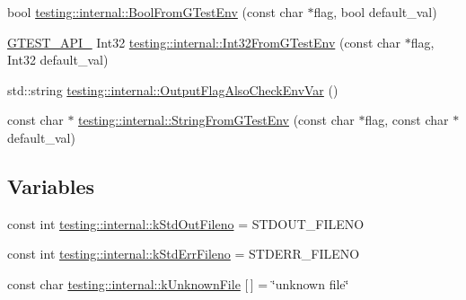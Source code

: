\begin{DoxyCompactItemize}
\item 
bool \mbox{\hyperlink{namespacetesting_1_1internal_a67132cdce23fb71b6c38ee34ef81eb4c}{testing\+::internal\+::\+Bool\+From\+G\+Test\+Env}} (const char $\ast$flag, bool default\+\_\+val)
\item 
\mbox{\hyperlink{_obj__test_2lib_2googletest-release-1_88_81_2googletest_2include_2gtest_2internal_2gtest-port_8h_aa73be6f0ba4a7456180a94904ce17790}{G\+T\+E\+S\+T\+\_\+\+A\+P\+I\+\_\+}} Int32 \mbox{\hyperlink{namespacetesting_1_1internal_a0f7e728793f9e6cb0aa2b69eaa468bf3}{testing\+::internal\+::\+Int32\+From\+G\+Test\+Env}} (const char $\ast$flag, Int32 default\+\_\+val)
\item 
std\+::string \mbox{\hyperlink{namespacetesting_1_1internal_a0c793c6d84760d900299916c077a1af4}{testing\+::internal\+::\+Output\+Flag\+Also\+Check\+Env\+Var}} ()
\item 
const char $\ast$ \mbox{\hyperlink{namespacetesting_1_1internal_a7ed785df46a339403b0f749d3a879201}{testing\+::internal\+::\+String\+From\+G\+Test\+Env}} (const char $\ast$flag, const char $\ast$default\+\_\+val)
\end{DoxyCompactItemize}
\subsection*{Variables}
\begin{DoxyCompactItemize}
\item 
const int \mbox{\hyperlink{namespacetesting_1_1internal_a24f0a3d50cac54a9132f4828ec9b96d9}{testing\+::internal\+::k\+Std\+Out\+Fileno}} = S\+T\+D\+O\+U\+T\+\_\+\+F\+I\+L\+E\+NO
\item 
const int \mbox{\hyperlink{namespacetesting_1_1internal_a747eccfdbdee3ff8af3bedc476a57c85}{testing\+::internal\+::k\+Std\+Err\+Fileno}} = S\+T\+D\+E\+R\+R\+\_\+\+F\+I\+L\+E\+NO
\item 
const char \mbox{\hyperlink{namespacetesting_1_1internal_ae16ec72cbaf31c1b9a5abf9be4478c5b}{testing\+::internal\+::k\+Unknown\+File}} \mbox{[}$\,$\mbox{]} = \char`\"{}unknown file\char`\"{}
\end{DoxyCompactItemize}
